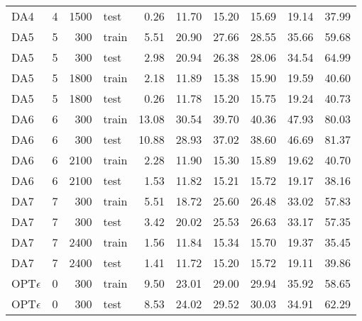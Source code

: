 \begin{table}[ht]
\begin{tabular}{lrrlrrrrrr}
  DA4 & 4 & 1500 & test & 0.26 & 11.70 & 15.20 & 15.69 & 19.14 & 37.99 \\ 
  DA5 & 5 & 300 & train & 5.51 & 20.90 & 27.66 & 28.55 & 35.66 & 59.68 \\ 
  DA5 & 5 & 300 & test & 2.98 & 20.94 & 26.38 & 28.06 & 34.54 & 64.99 \\ 
  DA5 & 5 & 1800 & train & 2.18 & 11.89 & 15.38 & 15.90 & 19.59 & 40.60 \\ 
  DA5 & 5 & 1800 & test & 0.26 & 11.78 & 15.20 & 15.75 & 19.24 & 40.73 \\ 
  DA6 & 6 & 300 & train & 13.08 & 30.54 & 39.70 & 40.36 & 47.93 & 80.03 \\ 
  DA6 & 6 & 300 & test & 10.88 & 28.93 & 37.02 & 38.60 & 46.69 & 81.37 \\ 
  DA6 & 6 & 2100 & train & 2.28 & 11.90 & 15.30 & 15.89 & 19.62 & 40.70 \\ 
  DA6 & 6 & 2100 & test & 1.53 & 11.82 & 15.21 & 15.72 & 19.17 & 38.16 \\ 
  DA7 & 7 & 300 & train & 5.51 & 18.72 & 25.60 & 26.48 & 33.02 & 57.83 \\ 
  DA7 & 7 & 300 & test & 3.42 & 20.02 & 25.53 & 26.63 & 33.17 & 57.35 \\ 
  DA7 & 7 & 2400 & train & 1.56 & 11.84 & 15.34 & 15.70 & 19.37 & 35.45 \\ 
  DA7 & 7 & 2400 & test & 1.41 & 11.72 & 15.20 & 15.72 & 19.11 & 39.86 \\ 
  OPT$\epsilon$ & 0 & 300 & train & 9.50 & 23.01 & 29.00 & 29.94 & 35.92 & 
  58.65 \\ 
  OPT$\epsilon$ & 0 & 300 & test & 8.53 & 24.02 & 29.52 & 30.03 & 34.91 & 
  62.29 \\ 
  \bottomrule
\end{tabular}
\end{table}